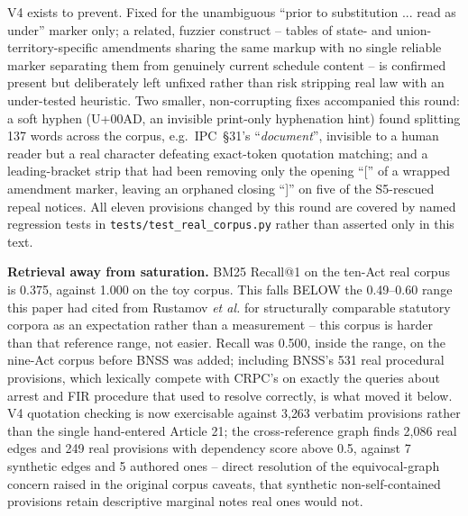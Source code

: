 \documentclass[conference]{IEEEtran}
\begin{document}
V4 exists to prevent. Fixed for the unambiguous ``prior to substitution
... read as under'' marker only; a related, fuzzier construct -- tables of
state- and union-territory-specific amendments sharing the same markup with
no single reliable marker separating them from genuinely current schedule
content -- is confirmed present but deliberately left unfixed rather than
risk stripping real law with an under-tested heuristic. Two smaller,
non-corrupting fixes accompanied this round: a soft hyphen
(U+00AD, an invisible print-only hyphenation hint) found splitting 137 words
across the corpus, e.g.\ IPC~\S31's ``\emph{docu\-ment}'', invisible to a
human reader but a real character defeating exact-token quotation matching;
and a leading-bracket strip that had been removing only the opening ``['' of
a wrapped amendment marker, leaving an orphaned closing ``]'' on five of the
S5-rescued repeal notices. All eleven provisions changed by this round are
covered by named regression tests in \texttt{tests/test\_real\_corpus.py}
rather than asserted only in this text.

\textbf{Retrieval away from saturation.} BM25 Recall@1 on the ten-Act real
corpus is 0.375, against 1.000 on the toy corpus. This falls BELOW the
0.49--0.60 range this paper had cited from Rustamov \textit{et al.} for
structurally comparable statutory corpora as an expectation rather than a
measurement -- this corpus is harder than that reference range, not easier.
Recall was 0.500, inside the range, on the nine-Act corpus before BNSS was
added; including BNSS's 531 real procedural provisions, which lexically
compete with CRPC's on exactly the queries about arrest and FIR procedure
that used to resolve correctly, is what moved it below. V4 quotation checking
is now exercisable against 3{,}263 verbatim provisions rather than the single
hand-entered Article 21; the cross-reference graph finds 2{,}086 real edges
and 249 real provisions with dependency score above 0.5, against 7 synthetic
edges and 5 authored ones -- direct resolution of the equivocal-graph concern
raised in the original corpus caveats, that synthetic non-self-contained
provisions retain descriptive marginal notes real ones would not.
\end{document}
